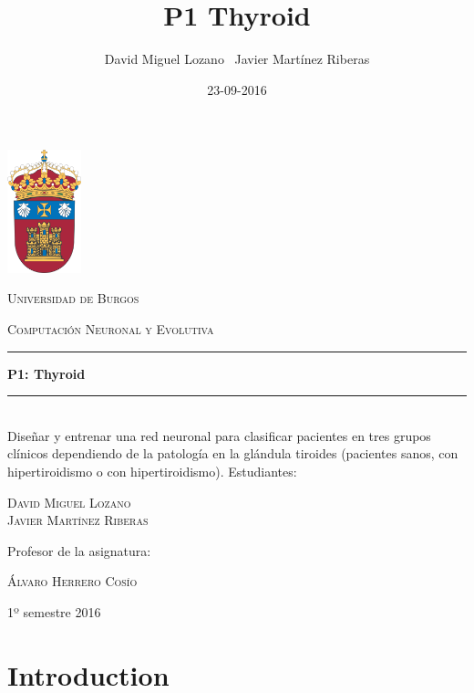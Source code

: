 \documentclass[a4paper,12pt,titlepage]{article}
\newcommand{\HRule}[1]{\rule{\linewidth}{#1}}
\begin{document}
\author{David Miguel Lozano \ Javier Martínez Riberas}
\title{P1 Thyroid}
\date{23-09-2016}

\begin{titlepage}
	\centering
	\includegraphics[width=0.16\textwidth]{ubu-logo.png}\par
	\vspace{0.3cm}
	{\scshape\LARGE Universidad de Burgos \par}
	\vfill
	{\scshape\Large Computación Neuronal y Evolutiva \par}
	\HRule{2pt}
	{\huge\bfseries P1: Thyroid \par}
	\HRule{2pt}
	\\ [0.5cm]
	{Diseñar y entrenar una red neuronal para clasificar pacientes en tres grupos clínicos dependiendo de la patología en la glándula tiroides (pacientes sanos, con hipertiroidismo o con hipertiroidismo).}
	\vfill
	Estudiantes:\par
	{\Large\scshape David Miguel Lozano \\ Javier Martínez Riberas \par}
	\vfill
	Profesor de la asignatura:\par
	\textsc{Álvaro Herrero Cosío}
	\vfill
	{\large 1º semestre 2016 \par}
\end{titlepage}

\newpage
\tableofcontents
\begin{appendix}
\end{appendix}

\newpage

\section{Introduction}
\end{document}
